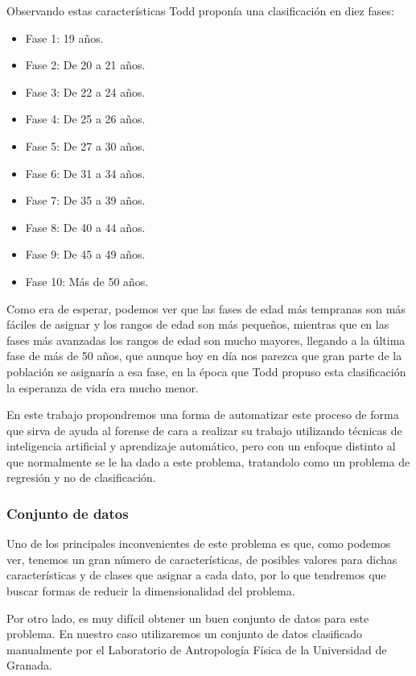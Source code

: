 Observando estas características Todd proponía una clasificación en diez fases:

\begin{itemize}
	\item Fase 1: 19 años.
	\item Fase 2: De 20 a 21 años.
	\item Fase 3: De 22 a 24 años.
	\item Fase 4: De 25 a 26 años.
	\item Fase 5: De 27 a 30 años.
	\item Fase 6: De 31 a 34 años.
	\item Fase 7: De 35 a 39 años.
	\item Fase 8: De 40 a 44 años.
	\item Fase 9: De 45 a 49 años.
	\item Fase 10: Más de 50 años.
\end{itemize}

Como era de esperar, podemos ver que las fases de edad más tempranas son más fáciles de asignar y los rangos de edad son más pequeños, mientras que en las fases más avanzadas los rangos de edad son mucho mayores, llegando a la última fase de más de 50 años, que aunque hoy en día nos parezca que gran parte de la población se asignaría a esa fase, en la época que Todd propuso esta clasificación la esperanza de vida era mucho menor.

En este trabajo propondremos una forma de automatizar este proceso de forma que sirva de ayuda al forense de cara a realizar su trabajo utilizando técnicas de inteligencia artificial y aprendizaje automático, pero con un enfoque distinto al que normalmente se le ha dado a este problema, tratandolo como un problema de regresión y no de clasificación.

\subsubsection{Conjunto de datos}

Uno de los principales inconvenientes de este problema es que, como podemos ver, tenemos un gran número de características, de posibles valores para dichas características y de clases que asignar a cada dato, por lo que tendremos que buscar formas de reducir la dimensionalidad del problema.

Por otro lado, es muy difícil obtener un buen conjunto de datos para este problema. En nuestro caso utilizaremos un conjunto de datos clasificado manualmente por el Laboratorio de Antropología Física de la Universidad de Granada\cite{laboratorioForenseUGR}.

